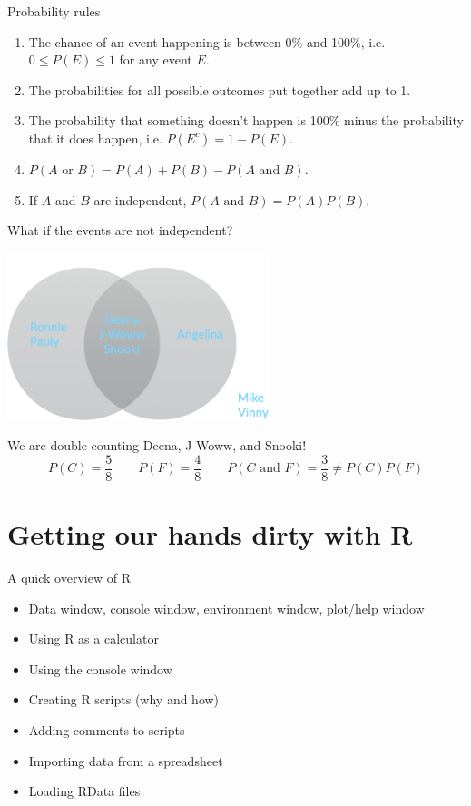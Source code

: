 \documentclass{beamer}\usepackage[]{graphicx}\usepackage[]{color}
\begin{document}
\begin{darkframes}
    \begin{frame}{Probability rules}
      \begin{enumerate}
        \item The chance of an event happening is between 0\% and 100\%, i.e. $0 \leq P(E) \leq 1$ for any event $E$.
        \item The probabilities for all possible outcomes put together add up to 1.
        \item The probability that something doesn’t happen is 100\% minus the probability that it does happen, i.e. $P(E^c) = 1-P(E)$.
        \item $P(\text{$A$ or $B$}) = P(A)+P(B) - P(\text{$A$ and $B$})$.
        \item If $A$ and $B$ are independent, $P(\text{$A$ and $B$}) = P(A)P(B)$.
      \end{enumerate}
    \end{frame}

    \begin{frame}{What if the events are not independent?}
      \begin{center}
        \includegraphics[width=3in]{venn}
      \end{center}
      
      We are double-counting Deena, J-Woww, and Snooki! 
      \[
        P(C) = \frac 5 8 \qquad P(F) = \frac 4 8 
        \qquad P(\text{$C$ and $F$}) = \frac 3 8 \neq P(C) P(F)
      \]
    \end{frame}

    \section{Getting our hands dirty with R}

    \begin{frame}{A quick overview of R}
      \begin{itemize}
        \item Data window, console window, environment window, plot/help window
        \item Using R as a calculator
        \item Using the console window
        \item Creating R scripts (why and how)
        \item Adding comments to scripts
        \item Importing data from a spreadsheet
        \item Loading RData files
      \end{itemize}
    \end{frame}


\end{darkframes}
\end{document}
